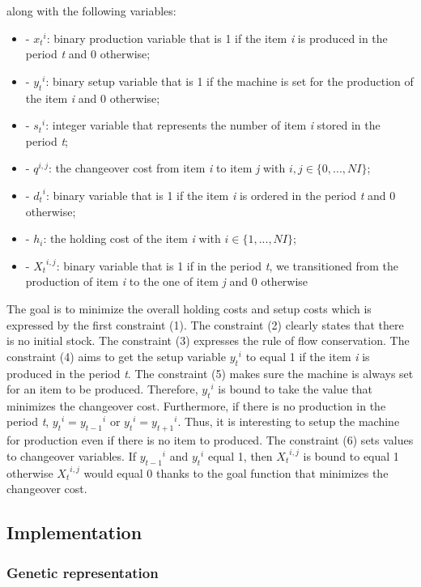 \documentclass[twocolumn,10pt]{asme2ej}
\begin{document}
along with the following variables:
\begin{itemize}
    \item - ${x_t}^i$: binary production variable that is 1 if the item \emph{i} is produced in the period \emph{t} and 0 otherwise;
    \item - ${y_t}^i$: binary setup variable that is 1 if the machine is set for the production of the item \emph{i} and 0 otherwise;
    \item - ${s_t}^i$: integer variable that represents the number of item \emph{i}  stored in the period \emph{t};
    \item - $q^{i,j}$: the changeover cost from item \emph{i} to item \emph{j} with $i,j \in \{0,...,NI\}$;
    \item - ${d_t}^i$: binary variable that is 1 if the item \emph{i} is ordered in the period \emph{t} and 0 otherwise;
    \item - $h_i$: the holding cost of the item \emph{i} with $i \in \{1,...,NI\}$;
    \item - ${X_t}^{i,j}$: binary variable that is 1 if in the period \emph{t}, we transitioned from the production of item \emph{i} to the one of item \emph{j} and 0 otherwise
\end{itemize}
The goal is to minimize the overall holding costs and setup costs which is expressed by the first constraint (1). The constraint (2) clearly states that there is no initial stock. The constraint (3) expresses the rule of flow conservation. The constraint (4) aims to get the setup variable ${y_t}^i$ to equal 1 if the item \emph{i} is produced in the period \emph{t}. The constraint (5) makes sure the machine is always set for an item to be produced. Therefore, ${y_t}^i$ is bound to take the value that minimizes the changeover cost. Furthermore, if there is no production in the period \emph{t}, ${y_t}^i = {y_{t-1}}^i$ or ${y_t}^i = {y_{t+1}}^i$. Thus, it is interesting to setup the machine for production even if there is no item to produced. The constraint (6) sets values to changeover variables. If ${y_{t-1}}^i$ and ${y_t}^i$ equal 1, then ${X_t}^{i,j}$ is bound to equal 1 otherwise ${X_t}^{i,j}$ would equal 0 thanks to the goal function that minimizes the changeover cost.

\subsection{Implementation}

\subsubsection{Genetic representation}
\end{document}
